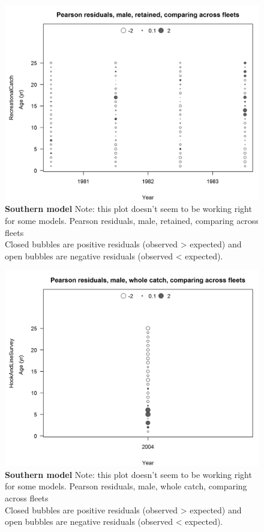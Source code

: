 \documentclass[12pt,]{article}
\begin{document}
\begin{figure}[htbp]
\centering
\includegraphics{./r4ss/plots_mod2/comp_agefit_sex3mkt2_multi-fleet_comparison.png}
\caption{\textbf{Southern model} Note: this plot doesn't seem to be
working right for some models. Pearson residuals, male, retained,
comparing across fleets\\
Closed bubbles are positive residuals (observed \textgreater{} expected)
and open bubbles are negative residuals (observed \textless{} expected).
\label{fig:mod2_12_comp_agefit_sex3mkt2_multi-fleet_comparison}}
\end{figure}

\begin{figure}[htbp]
\centering
\includegraphics{./r4ss/plots_mod2/comp_agefit_sex3mkt0_multi-fleet_comparison.png}
\caption{\textbf{Southern model} Note: this plot doesn't seem to be
working right for some models. Pearson residuals, male, whole catch,
comparing across fleets\\
Closed bubbles are positive residuals (observed \textgreater{} expected)
and open bubbles are negative residuals (observed \textless{} expected).
\label{fig:mod2_13_comp_agefit_sex3mkt0_multi-fleet_comparison}}
\end{figure}
\end{document}
